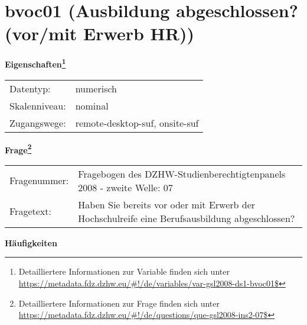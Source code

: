 
    \setcounter{footnote}{0}

    \vspace*{-1.8cm}
	\section{bvoc01 (Ausbildung abgeschlossen? (vor/mit Erwerb HR))}
	\label{section:bvoc01}



    \vspace*{0.5cm}
    \noindent\textbf{Eigenschaften\footnote{Detailliertere Informationen zur Variable finden sich unter
		\url{https://metadata.fdz.dzhw.eu/\#!/de/variables/var-gsl2008-ds1-bvoc01$}}}\\
	\begin{tabularx}{\hsize}{@{}lX}
	Datentyp: & numerisch \\
	Skalenniveau: & nominal \\
	Zugangswege: &
	  remote-desktop-suf, 
	  onsite-suf
 \\
    \end{tabularx}



				\vspace*{0.5cm}
                \noindent\textbf{Frage\footnote{Detailliertere Informationen zur Frage finden sich unter
		              \url{https://metadata.fdz.dzhw.eu/\#!/de/questions/que-gsl2008-ins2-07$}}}\\
				\begin{tabularx}{\hsize}{@{}lX}
					Fragenummer: &
					  Fragebogen des DZHW-Studienberechtigtenpanels 2008 - zweite Welle:
					  07
 \\
					Fragetext: & Haben Sie bereits vor oder mit Erwerb der Hochschulreife eine Berufsausbildung abgeschlossen? \\
				\end{tabularx}





        		\vspace*{0.5cm}
                \noindent\textbf{Häufigkeiten}

